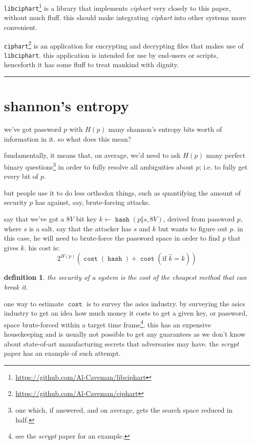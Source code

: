 \documentclass[twocolumn]{article}
\newtheorem{definition}{definition}
\DeclareMathOperator{\hash}{\mathtt{hash}}
\DeclareMathOperator{\cost}{\mathtt{cost}}
\begin{document}
\texttt{libciphart}\footnote{\url{https://github.com/Al-Caveman/libciphart}}
is a library that implements \emph{ciphart} very closely to this paper,
without much fluff.  this should make integrating \emph{ciphart} into other
systems more convenient.

\texttt{ciphart}\footnote{\url{https://github.com/Al-Caveman/ciphart}} is
an application for encrypting and decrypting files that makes use of
\texttt{libciphart}.  this application is intended for use by end-users or
scripts, henceforth it has some fluff to treat mankind with dignity.

\tableofcontents
\noindent
\rule{1\columnwidth}{2pt}

\section{shannon's entropy}
we've got password $p$ with $H(p)$ many shannon's entropy bits worth of
information in it.  so what does this mean?

fundamentally, it means that, on average, we'd need to ask $H(p)$ many
perfect binary questions\footnote{one which, if answered, and on average,
gets the search space reduced in half.} in order to fully resolve all
ambiguities about $p$; i.e.  to fully get every bit of $p$.  

but people use it to do less orthodox things, such as quantifying the
amount of security $p$ has against, say, brute-forcing attacks.

say that we've got a $8V$ bit key $k \gets \hash(p \Vert s, 8V)$, derived
from password $p$, where $s$ is a salt.  say that the attacker has $s$ and
$k$ but wants to figure out $p$.  in this case, he will need to brute-force
the password space in order to find $p$ that gives $k$.  his cost is:
\begin{equation}\label{eq_cost_passbruteforce}
    2^{H(p)} \left(
        \cost(\hash) + \cost(\text{if } \hat k = k)
    \right)
\end{equation}

\begin{definition}
the security of a system is the cost of the cheapest method that can break
it.
\end{definition}

one way to estimate $\cost$ is to survey the asics industry.  by surveying
the asics industry to get an idea how much money it costs to get a given
key, or password, space brute-forced within a target time
frame\footnote{see the \emph{scrypt} paper for an example.}.  this has an
expensive housekeeping and is usually not possible to get any guarantees as
we don't know about state-of-art manufacturing secrets that adversaries may
have.  the \emph{scrypt} paper has an example of such attempt.
\end{document}
